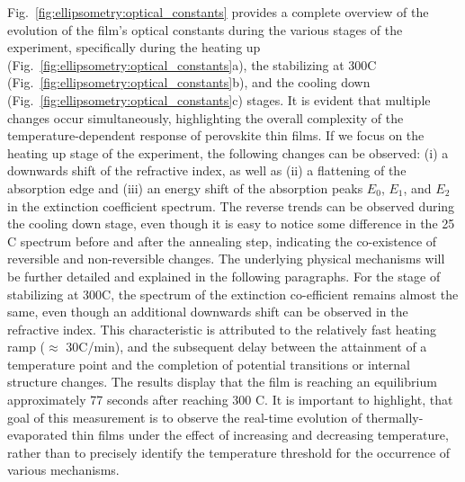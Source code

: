 Fig.~\ref{fig:ellipsometry:optical_constants} provides a complete overview of the evolution of the film's optical constants during the various stages of the experiment, specifically during the heating up (Fig.~\ref{fig:ellipsometry:optical_constants}a), the stabilizing at 300\degree C (Fig.~\ref{fig:ellipsometry:optical_constants}b), and the cooling down (Fig.~\ref{fig:ellipsometry:optical_constants}c) stages. It is evident that multiple changes occur simultaneously, highlighting the overall complexity of the temperature-dependent response of perovskite thin films. If we focus on the heating up stage of the experiment, the following changes can be observed: (i) a downwards shift of the refractive index, as well as (ii) a flattening of the absorption edge and (iii) an energy shift of the absorption peaks $E_0$, $E_1$, and $E_2$ in the extinction coefficient spectrum. The reverse trends can be observed during the cooling down stage, even though it is easy to notice some difference in the 25 \degree C spectrum before and after the annealing step, indicating the co-existence of reversible and non-reversible changes. The underlying physical mechanisms will be further detailed and explained in the following paragraphs. For the stage of stabilizing at 300\degree C, the spectrum of the extinction co-efficient remains almost the same, even though an additional downwards shift can be observed in the refractive index. This characteristic is attributed to the relatively fast heating ramp ($\approx$ 30\degree C/min), and the subsequent delay between the attainment of a temperature point and the completion of potential transitions or internal structure changes. The results display that the film is reaching an equilibrium approximately 77 seconds after reaching  300 \degree C. It is important to highlight, that goal of this measurement is to observe the real-time evolution of thermally-evaporated  thin films under the effect of increasing and decreasing temperature, rather than to precisely identify the temperature threshold for the occurrence of various mechanisms. 


